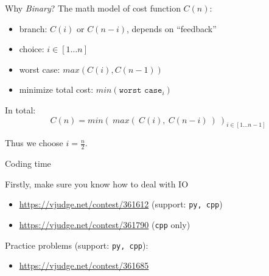 \documentclass{beamer}
\begin{document}
\begin{frame}{Why \emph{Binary}?}
  The math model of cost function $C(n)$: 
  \begin{itemize}
    \item branch: $C(i)$ or $C(n-i)$, depends on ``feedback''
    \item choice: $i \in [1\ldots n]$
    \item worst case: $max(C(i), C(n-1))$
    \item minimize total cost: $min(\texttt{worst case}_i)$
  \end{itemize}

  In total:
  $$
    C(n) = min(\ max(\ C(i),\ C(n-i)\ )\ )_{i \in [1 \ldots n-1]}
  $$

  Thus we choose $i=\frac{n}{2}$.

\end{frame}
  
\begin{frame}{Coding time}

  Firstly, make sure you know how to deal with IO
  \begin{itemize}
    \item \url{https://vjudge.net/contest/361612} (support: \texttt{py, cpp})
    \item \url{https://vjudge.net/contest/361790} (\texttt{cpp} only)
  \end{itemize}

  \vspace{5mm}

  Practice problems (support: \texttt{py, cpp}):
  \begin{itemize}
    \item \url{https://vjudge.net/contest/361685}
  \end{itemize}

\end{frame}
\end{document}
